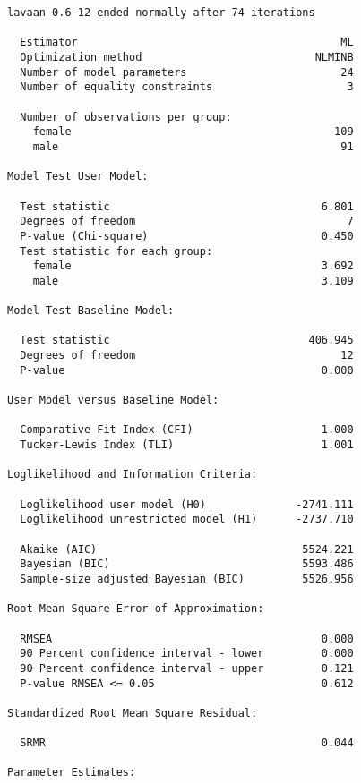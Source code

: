 \documentclass[
  letterpaper,
  DIV=11,
  numbers=noendperiod]{scrreprt}
\begin{document}
\begin{verbatim}
lavaan 0.6-12 ended normally after 74 iterations

  Estimator                                         ML
  Optimization method                           NLMINB
  Number of model parameters                        24
  Number of equality constraints                     3

  Number of observations per group:                   
    female                                         109
    male                                            91

Model Test User Model:
                                                      
  Test statistic                                 6.801
  Degrees of freedom                                 7
  P-value (Chi-square)                           0.450
  Test statistic for each group:
    female                                       3.692
    male                                         3.109

Model Test Baseline Model:

  Test statistic                               406.945
  Degrees of freedom                                12
  P-value                                        0.000

User Model versus Baseline Model:

  Comparative Fit Index (CFI)                    1.000
  Tucker-Lewis Index (TLI)                       1.001

Loglikelihood and Information Criteria:

  Loglikelihood user model (H0)              -2741.111
  Loglikelihood unrestricted model (H1)      -2737.710
                                                      
  Akaike (AIC)                                5524.221
  Bayesian (BIC)                              5593.486
  Sample-size adjusted Bayesian (BIC)         5526.956

Root Mean Square Error of Approximation:

  RMSEA                                          0.000
  90 Percent confidence interval - lower         0.000
  90 Percent confidence interval - upper         0.121
  P-value RMSEA <= 0.05                          0.612

Standardized Root Mean Square Residual:

  SRMR                                           0.044

Parameter Estimates:


\end{verbatim}
\end{document}
